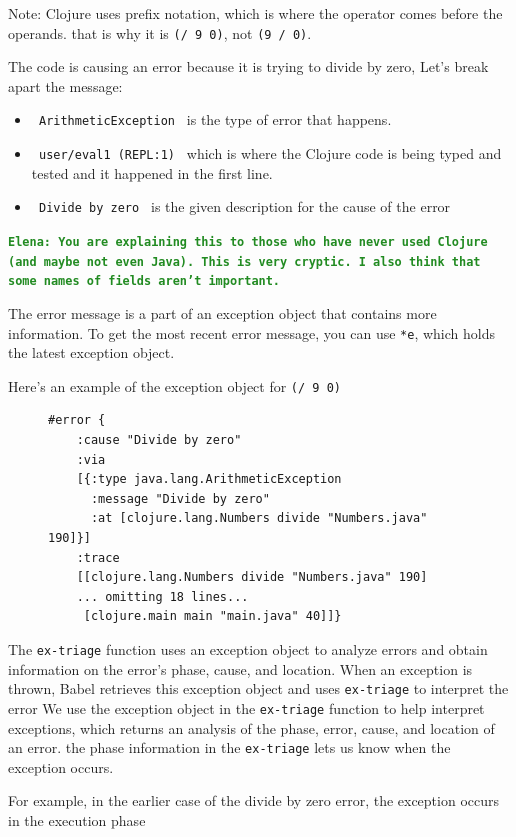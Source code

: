 \documentclass[12pt]{article}
\newcommand{\comment}[1]{{\bf \tt  {#1}}}
\newcommand{\emcomment}[1]{\textcolor{ForestGreen}{\comment{Elena: {#1}}}}
\begin{document}
Note: Clojure uses prefix notation, which is where the operator comes before the operands. that is why it is \texttt{(/ 9 0)}, not \texttt{(9 / 0)}.

The code is causing an error because it is trying to divide by zero, Let's break apart the message:
	\begin{itemize}
		\item \texttt{ ArithmeticException } is the type of error that happens.
		\item \texttt{ user/eval1 (REPL:1) } which is where the Clojure code is being typed and tested and it happened in the first line.
		\item \texttt{ Divide by zero } is the given description for the cause of the error
	\end{itemize}
\emcomment{You are explaining this to those who have never used Clojure (and maybe not even Java). This is very cryptic. I also think that some names of fields aren't important.}
	
The error message is a part of an exception object that contains more information. To get the most recent error message, you can use \texttt{*e}, which holds the latest exception object.

Here's an example of the exception object for \texttt{(/ 9 0)}

	\begin{figure}[h]
		\centering
		\begin{lstlisting}[breaklines=true, basicstyle=\ttfamily]
#error {
	:cause "Divide by zero"
	:via
	[{:type java.lang.ArithmeticException
	  :message "Divide by zero"
	  :at [clojure.lang.Numbers divide "Numbers.java" 190]}]
	:trace
	[[clojure.lang.Numbers divide "Numbers.java" 190]
	... omitting 18 lines...
	 [clojure.main main "main.java" 40]]}

		\end{lstlisting}
	\end{figure}
	
	The \texttt{ex-triage} function uses an exception object to analyze errors and obtain information on the error's phase, cause, and location.
	When an exception is thrown, Babel retrieves this exception object and uses \texttt{ex-triage} to interpret the error
	We use the exception object in the \texttt{ex-triage} function to help interpret exceptions, which returns an analysis of the phase, error, cause, and location of an error.
	the phase information in the \texttt{ex-triage} lets us know when the exception occurs. 
	
	For example, in the earlier case of the divide by zero error, the exception occurs in the execution phase
\end{document}
